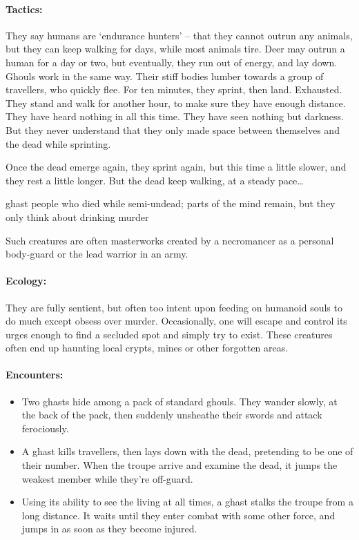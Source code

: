 \begin{multicols}{2}
\paragraph{Tactics:}
They say humans are `endurance hunters' -- that they cannot outrun any animals, but they can keep walking for days, while most animals tire.
Deer may outrun a human for a day or two, but eventually, they run out of energy, and lay down.
Ghouls work in the same way.
Their stiff bodies lumber towards a group of travellers, who quickly flee.
For ten minutes, they sprint, then land.
Exhausted.
They stand and walk for another hour, to make sure they have enough distance.
They have heard nothing in all this time.
They have seen nothing but darkness.
But they never understand that they only made space between themselves and the dead while sprinting.

Once the dead emerge again, they sprint again, but this time a little slower, and they rest a little longer.
But the dead keep walking, at a steady pace\ldots

  {ghast}%
  {people who died while semi-undead; parts of the mind remain, but they only think about drinking murder}%


Such creatures are often masterworks created by a necromancer as a personal body-guard or the lead warrior in an army.


\paragraph{Ecology:} They are fully sentient, but often too intent upon feeding on humanoid souls to do much except obsess over murder.
Occasionally, one will escape and control its urges enough to find a secluded spot and simply try to exist.
These creatures often end up haunting local crypts, mines or other forgotten areas.

\paragraph{Encounters:}

\begin{itemize}

  \item
  Two ghasts hide among a pack of standard ghouls.
  They wander slowly, at the back of the pack, then suddenly unsheathe their swords and attack ferociously.
  \item
  A ghast kills travellers, then lays down with the dead, pretending to be one of their number.
  When the troupe arrive and examine the dead, it jumps the weakest member while they're off-guard.
  \item
  Using its ability to see the living at all times, a ghast stalks the troupe from a long distance.
  It waits until they enter combat with some other force, and jumps in as soon as they become injured.


\end{itemize}
\end{multicols}
